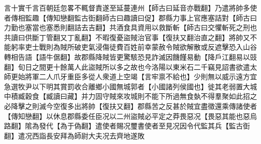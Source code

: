 言十實千言百朝廷忽畧不輒督責遂至延蔓連州【師古曰延音亦戰翻】乃遣將帥多使者傳相監趣【傳知戀翻監古衘翻師古曰趣讀曰促】郡縣力事上官應塞詰對【師古曰力勤也塞當也塞悉則翻詰去吉翻】共酒食具資用以救斷斬【師古曰交懼斬死之刑也共讀曰供斷丁管翻又丁亂翻】不暇復憂盜賊治官事【復扶又翻治直之翻】將帥又不能躬率吏士戰則為賊所破吏氣浸傷徒費百姓前幸蒙赦令賊欲解散或反遮擊恐入山谷轉相告語【語牛倨翻】故郡縣降賊皆更驚駭恐見詐滅因饑饉易動【降戶江翻易以豉翻】旬日之間更十餘萬人此盜賊所以多之故也今洛陽以東米石二千竊見詔書欲遣太師更始將軍二人爪牙重臣多從人衆道上空竭【言牢禀不給也】少則無以威示遠方宜急選牧尹以下明其賞罰收合離鄉小國無城郭者【小國諸列侯國也】徙其老弱置大城中積臧穀食【臧讀曰藏】并力固守賊來攻城則不能下所過無食埶不得羣聚如此招之必降擊之則滅今空復多出將帥【復扶又翻】郡縣苦之反甚於賊宜盡徵還乘傳諸使者【傳知戀翻】以休息郡縣委任臣况以二州盜賊必平定之莽畏惡况【畏惡其能也惡烏路翻】隂為發代【為于偽翻】遣使者賜况璽書使者至見况因令代監其兵【監古衘翻】遣况西詣長安拜為師尉大夫况去齊地遂敗

